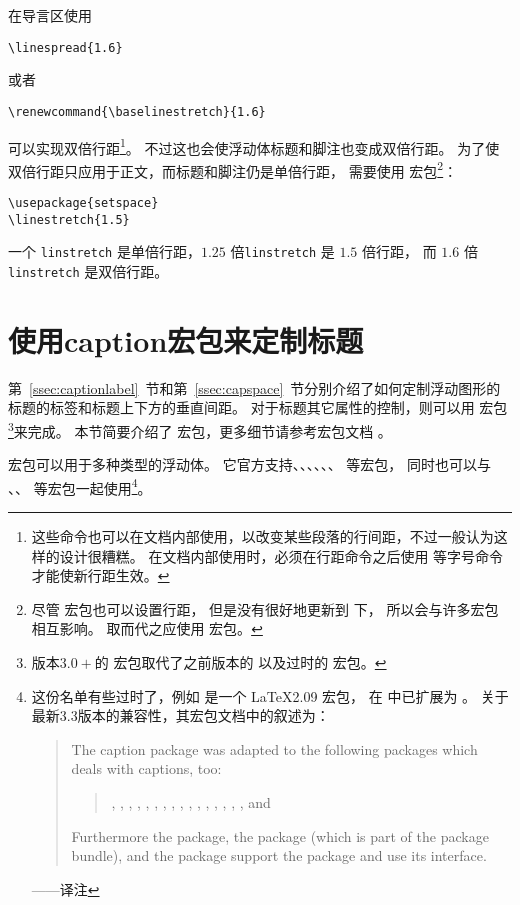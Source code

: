 在导言区使用
\begin{lstlisting}
\linespread{1.6}
\end{lstlisting}
或者
\begin{lstlisting}
\renewcommand{\baselinestretch}{1.6}
\end{lstlisting}
可以实现双倍行距\footnote{
	这些命令也可以在文档内部使用，以改变某些段落的行间距，不过一般认为这样的设计很糟糕。
	在文档内部使用时，必须在行距命令之后使用  等字号命令才能使新行距生效。}。
不过这也会使浮动体标题和脚注也变成双倍行距。
为了使双倍行距只应用于正文，而标题和脚注仍是单倍行距，
需要使用  宏包\footnote{
	尽管  宏包也可以设置行距，
	但是没有很好地更新到 \LaTeXe{} 下，
	所以会与许多宏包相互影响。
	取而代之应使用  宏包。}：
\begin{lstlisting}
\usepackage{setspace}
\linestretch{1.5}
\end{lstlisting}
一个 \texttt{linstretch} 是单倍行距，$1.25$ 倍\texttt{linstretch} 是 $1.5$ 倍行距，
而 $1.6$ 倍 \texttt{linstretch} 是双倍行距。


\section{使用caption宏包来定制标题}\label{sec:caption-pkg}

第~\ref{ssec:captionlabel}~节和第~\ref{ssec:capspace}~节分别介绍了如何定制浮动图形的标题的标签和标题上下方的垂直间距。
对于标题其它属性的控制，则可以用  宏包\footnote{%
	版本$3.0+$的  宏包取代了之前版本的  以及过时的  宏包。}来完成。
本节简要介绍了  宏包，更多细节请参考宏包文档 \cite{caption-doc}。

 宏包可以用于多种类型的浮动体。
它官方支持、、、、、、 等宏包，
同时也可以与 、、 等宏包一起使用\footnote{
	这份名单有些过时了，例如  是一个 \LaTeX2.09 宏包，
	在 \LaTeXe{} 中已扩展为 。
	关于最新3.3版本的兼容性，其宏包文档\cite{caption-doc}中的叙述为：
	\begin{quotation}
		The caption package was adapted to the following packages which deals with captions, too:
		
		\begin{quote}
			, , , , , , , , , , , , , , , , and 
		\end{quote}
		
		Furthermore the  package, the  package (which is part of the  package bundle), and the  package support the  package and use its  interface.
	\end{quotation}
	——译注}。

